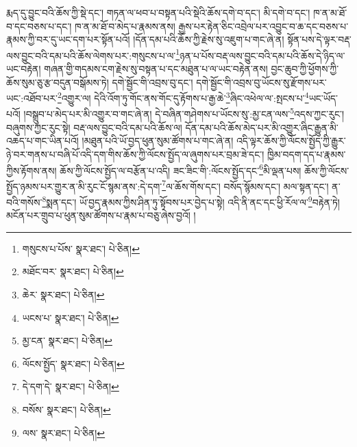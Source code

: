 རྨད་དུ་བྱུང་བའི་ཆོས་ཀྱི་སྡེ་དང་། གཏན་ལ་ཕབ་པ་བསྟན་པའི་སྡེའི་ཆོས་དགེ་བ་དང་། མི་དགེ་བ་དང་། ཁ་ན་མ་ཐོ་བ་དང་བཅས་པ་དང་། ཁ་ན་མ་ཐོ་བ་མེད་པ་རྣམས་ནས། རྒྱས་པར་རྟེན་ཅིང་འབྲེལ་པར་འབྱུང་བ་ཆ་དང་བཅས་པ་རྣམས་ཀྱི་བར་དུ་ཡང་དག་པར་སྟོན་པའོ། །དོན་དམ་པའི་ཆོས་ཀྱི་རྗེས་སུ་འཇུག་པ་གང་ཞེ་ན། སྟོན་པས་དེ་ལྟར་བརྡ་ལས་བྱུང་བའི་དམ་པའི་ཆོས་ལེགས་པར་:གསུངས་པ་ལ་\footnote{གསུངས་པ་པོས་  སྣར་ཐང་།  པེ་ཅིན། }ཉན་པ་པོས་བརྡ་ལས་བྱུང་བའི་དམ་པའི་ཆོས་དེ་ཉིད་ལ་ཡང་བརྟེན། གཞན་གྱི་གདམས་ངག་རྗེས་སུ་བསྟན་པ་དང་མཐུན་པ་ལ་ཡང་བརྟེན་ནས། བྱང་ཆུབ་ཀྱི་ཕྱོགས་ཀྱི་ཆོས་སུམ་ཅུ་རྩ་བདུན་བསྒོམས་ཏེ། དགེ་སྦྱོང་གི་འབྲས་བུ་དང་། དགེ་སྦྱོང་གི་འབྲས་བུ་ཡོངས་སུ་རྫོགས་པར་ཡང་:འཐོབ་པར་\footnote{མཐོང་བར་  སྣར་ཐང་།  པེ་ཅིན། }འགྱུར་ལ། དེའི་འོག་ཏུ་གོང་ནས་གོང་དུ་རྟོགས་པ་རྒྱ་ཆེ་\footnote{ཆེར་  སྣར་ཐང་།  པེ་ཅིན། }ཞིང་འཕེལ་ལ་:སྤངས་པ་\footnote{ཡངས་པ་  སྣར་ཐང་།  པེ་ཅིན། }ཡང་ཡོད་པའོ། །བསྒྲུབ་པ་མེད་པར་མི་འགྱུར་བ་གང་ཞེ་ན། དེ་བཞིན་གཤེགས་པ་ཡོངས་སུ་:མྱ་ངན་ལས་\footnote{མྱ་ངན་  སྣར་ཐང་།  པེ་ཅིན། }འདས་ཀྱང་རུང་། བཞུགས་ཀྱང་རུང་སྟེ། བརྡ་ལས་བྱུང་བའི་དམ་པའི་ཆོས་ལ། དོན་དམ་པའི་ཆོས་མེད་པར་མི་འགྱུར་ཞིང་རྒྱུན་མི་འཆད་པ་གང་ཡིན་པའོ། །མཐུན་པའི་ཡོ་བྱད་ཕུན་སུམ་ཚོགས་པ་གང་ཞེ་ན། འདི་ལྟར་ཆོས་ཀྱི་ལོངས་སྤྱོད་ཀྱི་རྒྱུར་ཉེ་བར་གནས་པ་བཞི་པོ་འདི་དག་གིས་ཆོས་ཀྱི་ལོངས་སྤྱོད་ལ་ཞུགས་པར་བྲམ་ཟེ་དང་། ཁྱིམ་བདག་དད་པ་རྣམས་ཀྱིས་རྟོགས་ནས། ཆོས་ཀྱི་ལོངས་སྤྱོད་ལ་བརྩོན་པ་འདི། ཟང་ཟིང་གི་:ལོངས་སྤྱོད་དང་\footnote{ལོངས་སྤྱོད་  སྣར་ཐང་།  པེ་ཅིན། }མི་ལྡན་པས། ཆོས་ཀྱི་ལོངས་སྤྱོད་ཉམས་པར་གྱུར་ན་མི་རུང་ངོ་སྙམ་ནས་:དེ་དག་\footnote{དེ་དག་དེ་  སྣར་ཐང་།  པེ་ཅིན། }ལ་ཆོས་གོས་དང་། བསོད་སྙོམས་དང་། མལ་སྟན་དང་། ན་བའི་གསོས་\footnote{བསོས་  སྣར་ཐང་།  པེ་ཅིན། }སྨན་དང་། ཡོ་བྱད་རྣམས་ཀྱིས་ཤིན་ཏུ་སྟོབས་པར་བྱེད་པ་སྟེ། འདི་ནི་ནང་དང་ཕྱི་རོལ་ལ་\footnote{ལས་  སྣར་ཐང་།  པེ་ཅིན། }བརྟེན་ཏེ། མངོན་པར་གྲུབ་པ་ཕུན་སུམ་ཚོགས་པ་རྣམ་པ་བཅུ་ཞེས་བྱའོ། །
